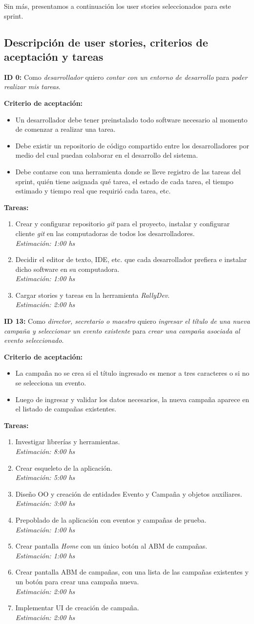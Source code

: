 \documentclass[a4paper, 10pt, twoside]{article}
\newcommand{\sprintstory}[4]{
  \noindent
  \textbf{ID #1:} Como \emph{#2} quiero \emph{#3} para \emph{#4}.
}
\newenvironment{criterios}{
  \textbf{Criterio de aceptación:}
  \begin{itemize}
}{
  \end{itemize}
}
\newcommand{\criterio}[1] {
  \item #1
}
\newenvironment{tasks}{
  \textbf{Tareas:}
  \begin{enumerate}
}{
  \end{enumerate}
}
\newcommand{\task}[2] {
  \item #1.\\
  \emph{Estimación: #2 hs}
}
\begin{document}
Sin más, presentamos a continuación los user stories seleccionados para este sprint.


\subsection{Descripción de user stories, criterios de aceptación y tareas}

\sprintstory{0}
            {desarrollador}
            {contar con un entorno de desarrollo}
            {poder realizar mis tareas}

\begin{criterios}
  \criterio{Un desarrollador debe tener preinstalado todo software necesario al momento de comenzar a realizar una tarea.}
  \criterio{Debe existir un repositorio de código compartido entre los desarrolladores por medio del cual puedan colaborar en el desarrollo del sistema.}
  \criterio{Debe contarse con una herramienta donde se lleve registro de las tareas del sprint, quién tiene asignada qué tarea, el estado de cada tarea, el tiempo estimado y tiempo real que requirió cada tarea, etc.}
\end{criterios}

\begin{tasks}
  \task{Crear y configurar repositorio \textit{git} para el proyecto, instalar y configurar cliente \textit{git} en las computadoras de todos los desarrolladores}{1:00}
  \task{Decidir el editor de texto, IDE, etc. que cada desarrollador prefiera e instalar dicho software en su computadora}{1:00}
  \task{Cargar stories y tareas en la herramienta \textit{RallyDev}}{2:00}
\end{tasks}


\sprintstory{13}
            {director, secretario o maestro}
            {ingresar el título de una nueva campaña y seleccionar un evento existente}
            {crear una campaña asociada al evento seleccionado}

\begin{criterios}
  \criterio{La campaña no se crea si el título ingresado es menor a tres caracteres o si no se selecciona un evento.}
  \criterio{Luego de ingresar y validar los datos necesarios, la nueva campaña aparece en el listado de campañas existentes.}
\end{criterios}

\begin{tasks}
  \task{Investigar librerías y herramientas}{8:00}
  \task{Crear esqueleto de la aplicación}{5:00}
  \task{Diseño OO y creación de entidades Evento y Campaña y objetos auxiliares}{3:00}
  \task{Prepoblado de la aplicación con eventos y campañas de prueba}{1:00}
  \task{Crear pantalla \emph{Home} con un único botón al ABM de campañas}{1:00}
  \task{Crear pantalla ABM de campañas, con una lista de las campañas existentes y un botón para crear una campaña nueva}{2:00}
  \task{Implementar UI de creación de campaña}{2:00}
\end{tasks}
\end{document}
